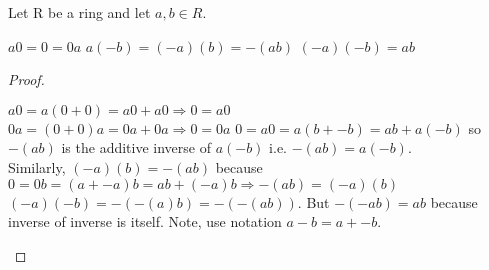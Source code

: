 \documentclass[class=scrartcl, crop=false]{standalone}
\begin{document}
\begin{proposition}[16.8]
  Let R be a ring and let $a, b \in R$.
  \begin{enumerate}
    \ii
    $a 0 = 0 = 0a$
    \ii
    $a(-b) = (-a)(b) = -(ab)$ 
    \ii
    $(-a)(-b) = ab$
  \end{enumerate} 
  \begin{proof}
    \begin{enumerate}
      \ii[]
      \ii
      $a 0 = a(0 + 0) = a 0 + a 0 \Rightarrow 0 = a 0$\\
      $0a = (0 + 0)a = 0a + 0a \Rightarrow 0 = 0a$ 
      \ii 
      $0 = a 0 = a(b + -b) = ab + a(-b)$ so $-(ab)$ is the additive inverse of $a(-b)$ i.e. $-(ab) = a(-b)$. \\
      Similarly, $(-a)(b) = -(ab)$ because  $0 = 0b = (a + -a)b = ab + (-a)b \Rightarrow -(ab) = (-a)(b)$
      \ii
      $(-a)(-b) = -(-(a)b) = -(-(ab))$. But $-(-ab) = ab$ because inverse of inverse is itself. Note, use notation $a - b = a + -b$.
    \end{enumerate} 
  \end{proof} 
\end{proposition} 
\end{document}

